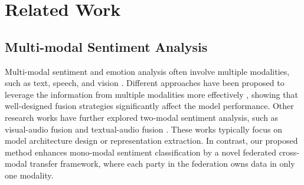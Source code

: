 \documentclass[11pt]{article}
\begin{document}

\section{Related Work}
\label{sec:related}
\subsection{Multi-modal Sentiment Analysis}
Multi-modal sentiment and emotion analysis often involve multiple modalities, such as text, speech, and vision \cite{Xueyang-wollmer2013youtube,Xueyang-rozgic2012ensemble}. Different approaches have been proposed to leverage the information from multiple modalities more effectively \cite{Xueyang-zadeh2017tensor, Xueyang-majumder2018multimodal, Xueyang-poria2016convolutional}, showing that well-designed fusion strategies significantly affect the model performance. Other research works have further explored two-modal sentiment analysis, such as visual-audio fusion \cite{Xueyang-metallinou2008audio,Xueyang-wollmer2013youtube} and textual-audio fusion \cite{Xueyang-li2019acoustic, Xueyang-poria2017context}. These works typically focus on model architecture design or representation extraction. In contrast, our proposed method enhances mono-modal sentiment classification by a novel federated cross-modal transfer framework, where each party in the federation owns data in only one modality.
\end{document}
